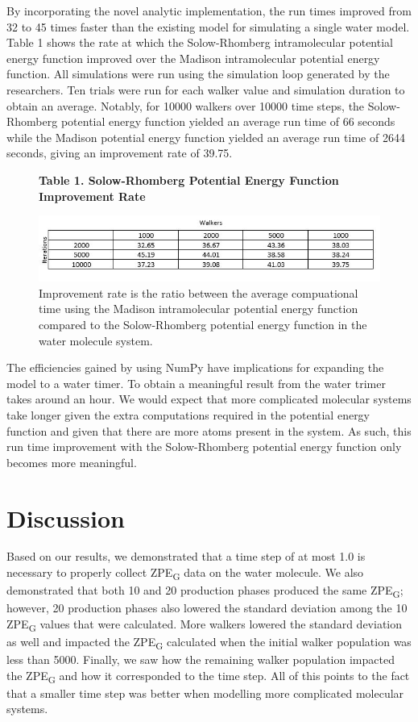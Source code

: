 \documentclass[journal=jacsat,manuscript=article]{achemso}
\newcommand*{\figuretitle}[1]{%
    {\centering%
    \textbf{#1}%
    \par\medskip}%
}
\begin{document}
By incorporating the novel analytic implementation, the run times improved from 32 to 45 times faster than the existing model for simulating a single water model. Table 1 shows the rate at which the Solow-Rhomberg intramolecular potential energy function improved over the Madison intramolecular potential energy function. All simulations were run using the simulation loop generated by the researchers. Ten trials were run for each walker value and simulation duration to obtain an average. Notably, for 10000 walkers over 10000 time steps, the Solow-Rhomberg potential energy function yielded an average run time of 66 seconds while the Madison potential energy function yielded an average run time of 2644 seconds, giving an improvement rate of 39.75.

\begin{figure}[H]
\centering
\figuretitle{Table 1. Solow-Rhomberg Potential Energy Function Improvement Rate}
\caption{Improvement rate is the ratio between the average compuational time using the Madison intramolecular potential energy function compared to the Solow-Rhomberg potential energy function in the water molecule system.}
\includegraphics[width=\linewidth]{figures/Table_1.jpg}
\end{figure}

The efficiencies gained by using NumPy have implications for expanding the model to a water timer. To obtain a meaningful result from the water trimer takes around an hour. We would expect that more complicated molecular systems take longer given the extra computations required in the potential energy function and given that there are more atoms present in the system. As such, this run time improvement with the Solow-Rhomberg potential energy function only becomes more meaningful.

\section{Discussion}

Based on our results, we demonstrated that a time step of at most 1.0 is necessary to properly collect ZPE\textsubscript{G} data on the water molecule. We also demonstrated that both 10 and 20 production phases produced the same ZPE\textsubscript{G}; however, 20 production phases also lowered the standard deviation among the 10 ZPE\textsubscript{G} values that were calculated. More walkers lowered the standard deviation as well and impacted the ZPE\textsubscript{G} calculated when the initial walker population was less than 5000. Finally, we saw how the remaining walker population impacted the ZPE\textsubscript{G} and how it corresponded to the time step. All of this points to the fact that a smaller time step was better when modelling more complicated molecular systems. 
\end{document}
